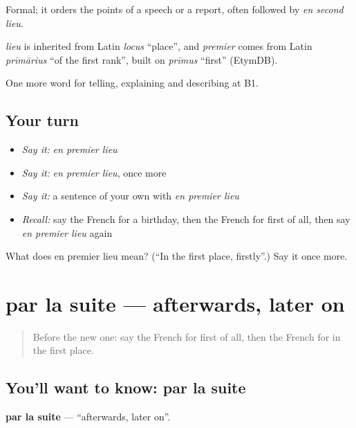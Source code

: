 Formal; it orders the points of a speech or a report, often followed by \emph{en second lieu}.

\begin{cousinweb}
\emph{lieu} is inherited from Latin \emph{locus} \textquotedblleft{}place\textquotedblright{}, and \emph{premier} comes from Latin \emph{prīmārius} \textquotedblleft{}of the first rank\textquotedblright{}, built on \emph{prīmus} \textquotedblleft{}first\textquotedblright{} (EtymDB).
\end{cousinweb}

\begin{grammarlens}[title={What you've built}]
One more word for telling, explaining and describing at B1.
\end{grammarlens}

\subsection*{Your turn}
\begin{itemize}
\raggedright
  \item \emph{Say it:} \emph{en premier lieu}
  \item \emph{Say it:} \emph{en premier lieu}, once more
  \item \emph{Say it:} a sentence of your own with \emph{en premier lieu}
  \item \emph{Recall:} say the French for a birthday, then the French for first of all, then say \emph{en premier lieu} again
\end{itemize}

\begin{tcolorbox}[breakable,colback=teal!4,colframe=teal!35!black,title={Before you move on}]
What does en premier lieu mean? (\textquotedblleft{}In the first place, firstly\textquotedblright{}.) Say it once more.
\end{tcolorbox}
\section[par la suite]{par la suite — afterwards, later on}

\label{lesson:FR-C268-par-la-suite}



\begin{quote}
Before the new one: say the French for first of all, then the French for in the first place.
\end{quote}

\subsection*{You'll want to know: par la suite}
\textbf{par la suite} — \textquotedblleft{}afterwards, later on\textquotedblright{}.

